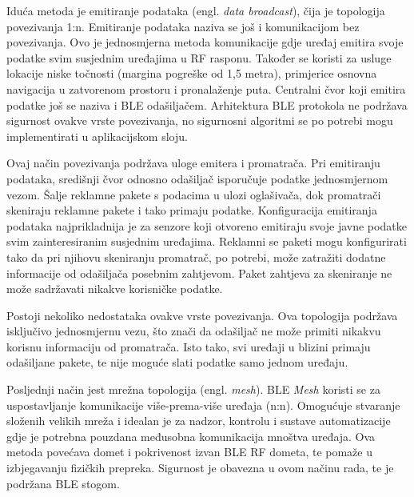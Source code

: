 Iduća metoda je emitiranje podataka (engl. \textit{data broadcast}), čija je topologija povezivanja 1:n. Emitiranje podataka naziva se još i komunikacijom bez povezivanja. Ovo je jednosmjerna metoda komunikacije gdje uređaj emitira svoje podatke svim susjednim uređajima u RF rasponu. Također se koristi za usluge lokacije niske točnosti (margina pogreške od 1,5 metra), primjerice osnovna navigacija u zatvorenom prostoru i pronalaženje puta. Centralni čvor koji emitira podatke još se naziva i BLE odašiljačem. Arhitektura BLE protokola ne podržava sigurnost ovakve vrste povezivanja, no sigurnosni algoritmi se po potrebi mogu implementirati u aplikacijskom sloju. 

Ovaj način povezivanja podržava uloge emitera i promatrača. Pri emitiranju podataka, središnji čvor odnosno odašiljač isporučuje podatke jednosmjernom vezom. Šalje reklamne pakete s podacima u ulozi oglašivača, dok promatrači skeniraju reklamne pakete i tako primaju podatke. Konfiguracija emitiranja podataka najprikladnija je za senzore koji otvoreno emitiraju svoje javne podatke svim zainteresiranim susjednim uređajima. Reklamni se paketi mogu konfigurirati tako da pri njihovu skeniranju promatrač, po potrebi, može zatražiti dodatne informacije od odašiljača posebnim zahtjevom. Paket zahtjeva za skeniranje ne može sadržavati nikakve korisničke podatke.

Postoji nekoliko nedostataka ovakve vrste povezivanja. Ova topologija podržava isključivo jednosmjernu vezu, što znači da odašiljač ne može primiti nikakvu korisnu informaciju od promatrača. Isto tako, svi uređaji u blizini primaju odašiljane pakete, te nije moguće slati podatke samo jednom uređaju. 

Posljednji način jest mrežna topologija (engl. \textit{mesh}). BLE \textit{Mesh} koristi se za uspostavljanje komunikacije više-prema-više uređaja (n:n). Omogućuje stvaranje složenih velikih mreža i idealan je za nadzor, kontrolu i sustave automatizacije gdje je potrebna pouzdana međusobna komunikacija mnoštva uređaja. Ova metoda povećava domet i pokrivenost izvan BLE RF dometa, te pomaže u izbjegavanju fizičkih prepreka. Sigurnost je obavezna u ovom načinu rada, te je podržana BLE stogom. \cite{ble_profiles}

\eject